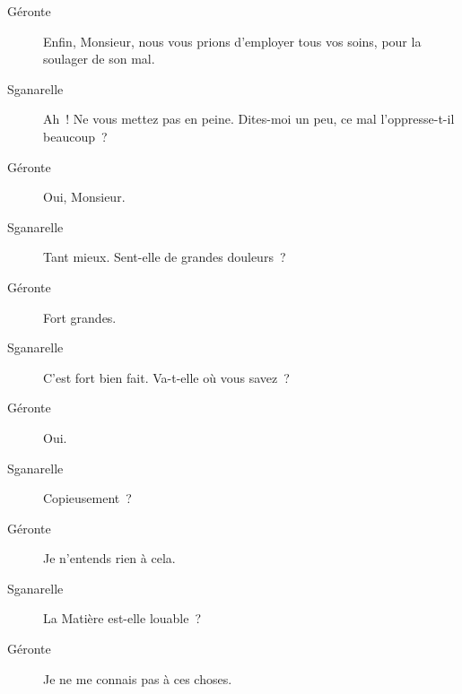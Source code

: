 \documentclass[french,twoside]{book} %
\begin{document}
 \begin{description} \item[Géronte] 

Enfin, Monsieur, nous vous prions d’employer tous vos soins, pour la soulager de son mal.\end{description}
 \begin{description} \item[Sganarelle] 

Ah ! Ne vous mettez pas en peine. Dites-moi un peu, ce mal l’oppresse-t-il beaucoup ?\end{description}
 \begin{description} \item[Géronte] 

Oui, Monsieur.\end{description}
 \begin{description} \item[Sganarelle] 

Tant mieux. Sent-elle de grandes douleurs ?\end{description}
 \begin{description} \item[Géronte] 

Fort grandes.\end{description}
 \begin{description} \item[Sganarelle] 

C’est fort bien fait. Va-t-elle où vous savez ?\end{description}
 \begin{description} \item[Géronte] 

Oui.\end{description}
 \begin{description} \item[Sganarelle] 

Copieusement ?\end{description}
 \begin{description} \item[Géronte] 

Je n’entends rien à cela.\end{description}
 \begin{description} \item[Sganarelle] 

La Matière est-elle louable ?\end{description}
 \begin{description} \item[Géronte] 

Je ne me connais pas à ces choses.\end{description}
\end{document}
